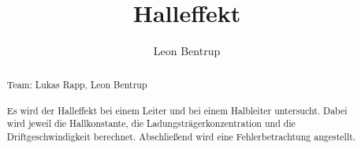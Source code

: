 \documentclass[12pt, a4paper, abstracton]{scrreprt}
\title{Halleffekt}
\author{Leon Bentrup}
\begin{document}
\maketitle
\begin{abstract}
Team: Lukas Rapp, Leon Bentrup \\ \\
Es wird der Halleffekt bei einem Leiter und bei einem Halbleiter untersucht.
Dabei wird jeweil die Hallkonstante, die Ladungsträgerkonzentration und die Driftgeschwindigkeit berechnet. Abschließend wird eine Fehlerbetrachtung angestellt.
\end{abstract}
\tableofcontents




\end{document}
